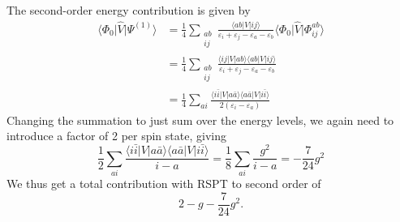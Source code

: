 The second-order energy contribution is given by
\begin{align*}
    \langle \Phi_0 \vert \hat{V} \vert \Psi^{(1)} \rangle &= \frac{1}{4} \sum_{\substack{ab \\ ij}} \frac{\langle ab \vert V \vert ij \rangle}{\varepsilon_i + \varepsilon_j - \varepsilon_a - \varepsilon_b} \langle \Phi_0 \vert \hat{V} \vert \Phi_{ij}^{ab} \rangle \\
    &= \frac{1}{4} \sum_{\substack{ab \\ ij}} \frac{\langle ij \vert V \vert ab \rangle \langle ab \vert V \vert ij \rangle }{\varepsilon_i + \varepsilon_j - \varepsilon_a - \varepsilon_b} \\
    &= \frac{1}{4} \sum_{ai} \frac{
        \langle i\bar{i} \vert V \vert a\bar{a} \rangle %
        \langle a\bar{a} \vert V \vert i\bar{i} \rangle %
    }{2(\varepsilon_i - \varepsilon_a)}
\end{align*}
Changing the summation to just sum over the energy levels, we again need to introduce a factor of 2 per spin state, giving
\begin{equation*}
    \frac{1}{2} \sum_{ai} \frac{
        \langle i\bar{i} \vert V \vert a\bar{a} \rangle %
        \langle a\bar{a} \vert V \vert i\bar{i} \rangle %
    }{i - a} = \frac{1}{8} \sum_{ai} \frac{g^2}{i - a} = -\frac{7}{24} g^2
\end{equation*}
We thus get a total contribution with RSPT to second order of
\begin{equation*}
    2 - g - \frac{7}{24} g^2.
\end{equation*}

